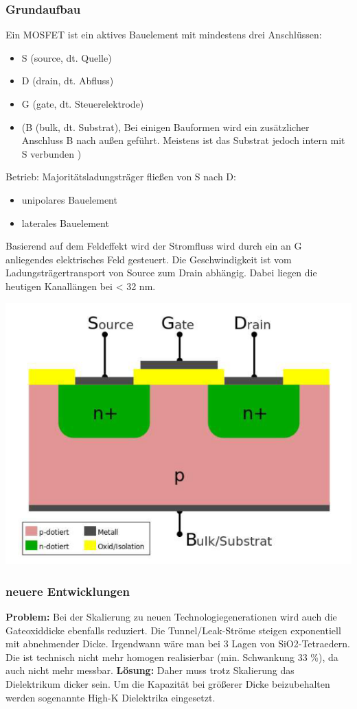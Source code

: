 	\subsubsection{Grundaufbau}	
	Ein MOSFET ist ein aktives Bauelement mit mindestens drei Anschlüssen:
	\begin{itemize}
		\item S (source, dt. Quelle)
		\item D (drain, dt. Abfluss)
		\item G (gate, dt. Steuerelektrode)
		\item (B (bulk, dt. Substrat), Bei einigen Bauformen wird ein zusätzlicher Anschluss B nach außen geführt. Meistens ist das 		Substrat jedoch intern mit S verbunden )
	\end{itemize}
	Betrieb: Majoritätsladungsträger fließen von S nach D:
	\begin{itemize}
		\item unipolares Bauelement
		\item laterales Bauelement
	\end{itemize}
	Basierend auf dem Feldeffekt wird der Stromfluss wird durch ein an G anliegendes	elektrisches Feld gesteuert.
	\newline
	Die Geschwindigkeit ist vom Ladungsträgertransport von Source zum Drain abhängig. Dabei liegen die heutigen Kanallängen bei < 32 nm.
		\begin{center}
			\includegraphics[width=0.7\linewidth]{Kapitel/Kap06/MOS_Transistor.png}
		\end{center}
	\subsubsection{neuere Entwicklungen}
		\textbf{Problem: }
		\newline
		Bei der Skalierung zu neuen Technologiegenerationen wird auch die Gateoxiddicke ebenfalls reduziert. 
		Die Tunnel/Leak-Ströme steigen exponentiell mit abnehmender Dicke.
		Irgendwann wäre man bei 3 Lagen von SiO2-Tetraedern. Die ist technisch nicht mehr homogen realisierbar (min. Schwankung 33 \%), da auch nicht mehr messbar. 
		\newline
		\textbf{Lösung: }
		\newline
		Daher muss trotz Skalierung das Dielektrikum dicker sein. Um die Kapazität bei größerer Dicke beizubehalten werden sogenannte High-K Dielektrika eingesetzt. 
		
